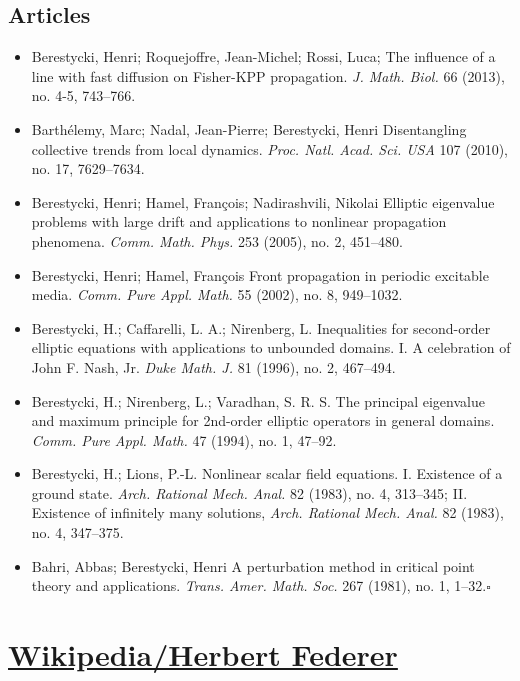 \documentclass{book}
\numberwithin{equation}{section}
\begin{document}
\section{Articles}
\begin{itemize}
    \item Berestycki, Henri; Roquejoffre, Jean-Michel; Rossi, Luca; The influence of a line with fast diffusion on Fisher-KPP propagation. \textit{J. Math. Biol.} 66 (2013), no. 4-5, 743--766.
    \item Barthélemy, Marc; Nadal, Jean-Pierre; Berestycki, Henri Disentangling collective trends from local dynamics. \textit{Proc. Natl. Acad. Sci. USA} 107 (2010), no. 17, 7629--7634.
    \item Berestycki, Henri; Hamel, François; Nadirashvili, Nikolai Elliptic eigenvalue problems with large drift and applications to nonlinear propagation phenomena. \textit{Comm. Math. Phys.} 253 (2005), no. 2, 451--480.
    \item Berestycki, Henri; Hamel, François Front propagation in periodic excitable media. \textit{Comm. Pure Appl. Math.} 55 (2002), no. 8, 949--1032.
    \item Berestycki, H.; Caffarelli, L. A.; Nirenberg, L. Inequalities for second-order elliptic equations with applications to unbounded domains. I. A celebration of John F. Nash, Jr. \textit{Duke Math. J.} 81 (1996), no. 2, 467--494.
    \item Berestycki, H.; Nirenberg, L.; Varadhan, S. R. S. The principal eigenvalue and maximum principle for 2nd-order elliptic operators in general domains. \textit{Comm. Pure Appl. Math.} 47 (1994), no. 1, 47--92.
    \item Berestycki, H.; Lions, P.-L. Nonlinear scalar field equations. I. Existence of a ground state. \textit{Arch. Rational Mech. Anal.} 82 (1983), no. 4, 313--345; II. Existence of infinitely many solutions, \textit{Arch. Rational Mech. Anal.} 82 (1983), no. 4, 347--375.
    \item Bahri, Abbas; Berestycki, Henri A perturbation method in critical point theory and applications. \textit{Trans. Amer. Math. Soc.} 267 (1981), no. 1, 1--32.\hfill$\square$
\end{itemize}


\chapter{\href{https://en.wikipedia.org/wiki/Herbert_Federer}{Wikipedia/Herbert Federer}}
\end{document}
